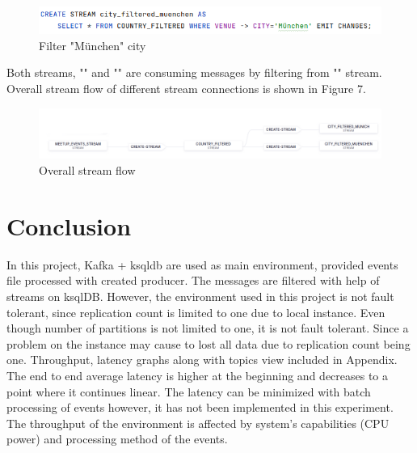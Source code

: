 \documentclass[sigplan,screen]{acmart}
\begin{document}
\begin{figure}[H]
    \centerline{\includegraphics[scale=.3]{assets/filter_munchen_stream.png}}
    \caption{Filter "München" city }
    \label{fig}
\end{figure}

Both streams, "" and "" are consuming messages by filtering from "" stream. Overall stream flow of different stream connections is shown in Figure 7. 

\begin{figure}[H]
    \centerline{\includegraphics[scale=.2]{assets/stream_flow.png}}
    \caption{Overall stream flow  }
    \label{fig}
\end{figure}



\section{Conclusion}
In this project, Kafka + ksqldb are used as main environment, provided events file processed with created producer. The messages are filtered with help of streams on ksqlDB. However, the environment used in this project is not fault tolerant, since replication count is limited to one due to local instance. Even though number of partitions is not limited to one, it is not fault tolerant. Since a problem on the instance may cause to lost all data due to replication count being one. Throughput, latency graphs along with topics view included in Appendix. The end to end average latency is higher at the beginning and decreases to a point where it continues linear. The latency can be minimized with batch processing of events however, it has not been implemented in this experiment. The throughput of the environment is affected by system's capabilities (CPU power) and processing method of the events. 






\onecolumn
\newpage



\end{document}
